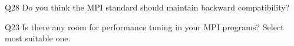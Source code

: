\begin{description}%
\item{Q28} Do you think the MPI standard should maintain backward compatibility?%
\item{Q23} Is there any room for performance tuning in your MPI programs? Select most suitable one.%
\end{description}%
